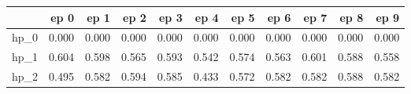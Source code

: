 \begin{tabular}{lrrrrrrrrrr}
\toprule
{} &   ep 0 &   ep 1 &   ep 2 &   ep 3 &   ep 4 &   ep 5 &   ep 6 &   ep 7 &   ep 8 &   ep 9 \\
\midrule
hp\_0 &  0.000 &  0.000 &  0.000 &  0.000 &  0.000 &  0.000 &  0.000 &  0.000 &  0.000 &  0.000 \\
hp\_1 &  0.604 &  0.598 &  0.565 &  0.593 &  0.542 &  0.574 &  0.563 &  0.601 &  0.588 &  0.558 \\
hp\_2 &  0.495 &  0.582 &  0.594 &  0.585 &  0.433 &  0.572 &  0.582 &  0.582 &  0.588 &  0.582 \\
\bottomrule
\end{tabular}
